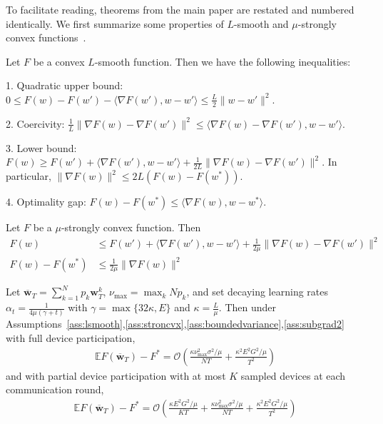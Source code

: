 To facilitate reading, theorems from the main paper are restated and numbered identically. We first summarize some properties of $L$-smooth and $\mu$-strongly
convex functions~\cite{rockafellar1970convex}. 
\begin{lemma}
	Let $F$ be a convex $L$-smooth function. Then we have the following
	inequalities:
	
	1. Quadratic upper bound: $0\leq F(w)-F(w')-\langle\nabla F(w'),w-w'\rangle\leq\frac{L}{2}\|w-w'\|^{2}$. 
	
	2. Coercivity: $\frac{1}{L}\|\nabla F(w)-\nabla F(w')\|^{2}\leq\langle\nabla F(w)-\nabla F(w'),w-w'\rangle$.
	
	3. Lower bound: $F(w)\geq F(w')+\langle\nabla F(w'),w-w'\rangle+\frac{1}{2L}\|\nabla F(w)-\nabla F(w')\|^{2}$.
	In particular, $\|\nabla F(w)\|^{2}\leq2L(F(w)-F(w^{\ast}))$.
	
	4. Optimality gap: $F(w)-F(w^{\ast})\leq$$\langle\nabla F(w),w-w^{\ast}\rangle$.
\end{lemma}
%
\begin{lemma}
	Let $F$ be a $\mu$-strongly convex function. Then 
	\begin{align*}
	F(w) & \leq F(w')+\langle\nabla F(w'),w-w'\rangle+\frac{1}{2\mu}\|\nabla F(w)-\nabla F(w')\|^{2}\\
	F(w)-F(w^{\ast}) & \leq\frac{1}{2\mu}\|\nabla F(w)\|^{2}
	\end{align*}
\end{lemma}

\begin{thm}
	Let $\overline{\mathbf{w}}_{T}=\sum_{k=1}^{N}p_{k}\mathbf{w}_{T}^{k}$,
	$\nu_{\max}=\max_{k}Np_{k}$, and set decaying learning rates $\alpha_{t}=\frac{1}{4\mu(\gamma+t)}$
	with $\gamma=\max\{32\kappa,E\}$ and $\kappa=\frac{L}{\mu}$. Then
	under Assumptions~\ref{ass:lsmooth},\ref{ass:stroncvx},\ref{ass:boundedvariance},\ref{ass:subgrad2} with full device participation, 
	\begin{align*}
	\mathbb{E}F(\overline{\mathbf{w}}_{T})-F^{\ast}=\mathcal{O}\left(\frac{\kappa\nu_{\max}^{2}\sigma^{2}/\mu}{NT}+\frac{\kappa^{2}E^{2}G^{2}/\mu}{T^{2}}\right)
	\end{align*}
	and with partial device participation with at most $K$ sampled devices
	at each communication round, 
	\begin{align*}
	\mathbb{E}F(\overline{\mathbf{w}}_{T})-F^{\ast}=\mathcal{O}\left(\frac{\kappa E^{2}G^{2}/\mu}{KT}+\frac{\kappa\nu_{\max}^{2}\sigma^{2}/\mu}{NT}+\frac{\kappa^{2}E^{2}G^{2}/\mu}{T^{2}}\right)
	\end{align*}
\end{thm}

